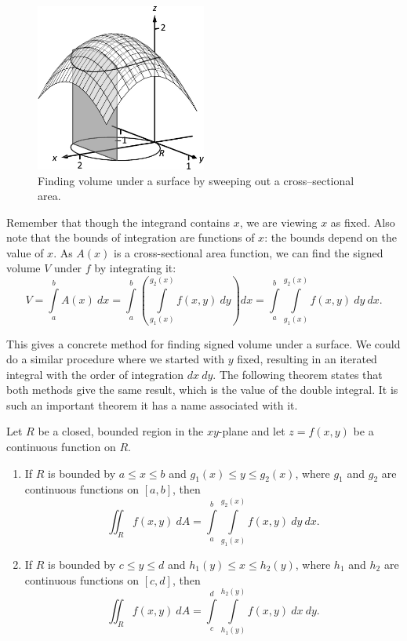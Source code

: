 \begin{figure}
	\begin{center}
			\includegraphics[width=0.5\textwidth]{fig_multiple_6}
	\caption{Finding volume under a surface by sweeping out a cross--sectional area.}
	\label{fig_multiple_6}
	\end{center}
\end{figure}

Remember that though the integrand contains $x$, we are viewing $x$ as fixed. Also note that the bounds of integration are functions of $x$: the bounds depend on the value of $x$. As $A(x)$ is a cross-sectional area function, we can find the signed volume $V$ under $f$ by integrating it:
$$V = \int\limits_a^b A(x)\ dx = \int\limits_a^b\left(\int\limits_{g_1(x)}^{g_2(x)} f(x,y)\ dy\right)dx = \int\limits_a^b\int\limits_{g_1(x)}^{g_2(x)} f(x,y)\ dy\ dx.$$

This gives a concrete method for finding signed volume under a surface. We could do a similar procedure where we started with $y$ fixed, resulting in an iterated integral with the order of integration $dx\ dy$. The following theorem states that both methods give the same result, which is the value of the double integral. It is such an important theorem it has a name associated with it.

\begin{theorem}\label{thm:fubini}
Let $R$ be a closed, bounded region in the $xy$-plane and let $z=f(x,y)$ be a continuous function on $R$.%
\begin{enumerate}[align=left]
	\item If $R$ is bounded by $a\leq x\leq b$ and $g_1(x)\leq y\leq g_2(x)$, where $g_1$ and $g_2$ are continuous functions on $[a,b]$, then
	$$\iint_R f(x,y)\ dA = \int\limits_a^b\int\limits_{g_1(x)}^{g_2(x)} f(x,y)\ dy\ dx.$$
	
	\item If $R$ is bounded by $c\leq y\leq d$ and $h_1(y)\leq x\leq h_2(y)$, where $h_1$ and $h_2$ are continuous functions on $[c,d]$, then
	$$\iint_R f(x,y)\ dA = \int\limits_c^d\int\limits_{h_1(y)}^{h_2(y)} f(x,y)\ dx\ dy.$$
\end{enumerate}
\end{theorem}

